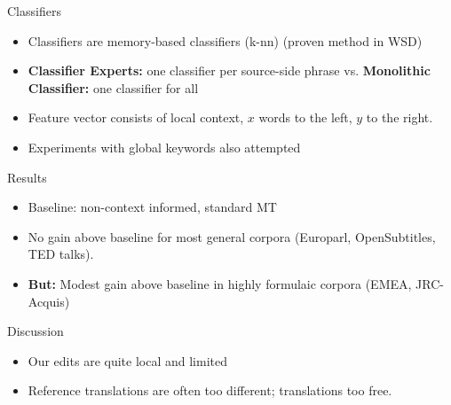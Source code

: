 \documentclass[compress]{beamer}
\begin{document}
\begin{frame}


  \begin{block}{Classifiers}
    \begin{itemize}
      \item Classifiers are memory-based classifiers (k-nn) (proven method in WSD)
      \item \textbf{Classifier Experts:} one classifier per
        source-side phrase  vs. \textbf{Monolithic Classifier:} one classifier for all
      \item Feature vector consists of local context, $x$ words to the left,
        $y$ to the right.
      \item Experiments with global keywords also attempted
    \end{itemize}
  \end{block}

\end{frame}


\begin{frame}


  \begin{block}{Results}

    \begin{itemize}
      \item Baseline: non-context informed, standard MT
      \item No gain above baseline for most general corpora
        (Europarl, OpenSubtitles, TED talks).
      \item \textbf{But:} Modest gain above baseline in highly formulaic
        corpora (EMEA, JRC-Acquis)
    \end{itemize}

  \end{block}
\end{frame}


\begin{frame}

  \begin{block}{Discussion}
    \begin{itemize}
      \item Our edits are quite local and limited
      \item Reference translations are often too different; translations too
        free.
    \end{itemize}
  \end{block}

\end{frame}
\end{document}
